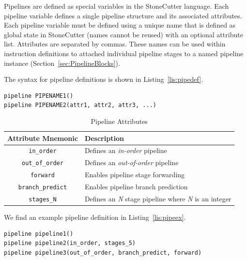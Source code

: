 \documentclass{article}
\begin{document}
Pipelines are defined as special variables in the StoneCutter language.  Each pipeline variable defines a single 
pipeline structure and its associated attributes.  Each pipeline variable must be defined using a unique name that 
is defined as global state in StoneCutter (names cannot be reused) with an optional attribute list.  Attributes are separated by commas.  These names 
can be used within instruction definitions to attached individual pipeline stages to a named pipeline instance (Section~\ref{sec:PipelineBlocks}).  

The syntax for pipeline definitions is shown in Listing~\ref{lis:pipedef}.  

\vspace{0.125in}
\begin{lstlisting}[frame=single,style=base,caption={Pipeline Definition Syntax},captionpos=b,label={lis:pipedef}]
pipeline PIPENAME1()
pipeline PIPENAME2(attr1, attr2, attr3, ...)
\end{lstlisting}

\begin{table}[h]
\begin{center}
\caption{Pipeline Attributes}
\vspace{0.125in}
\label{tab:pipeattrs}
\begin{tabular}{|c|l|}
\hline
\textbf{Attribute Mnemonic} & \textbf{Description}\\
\hline
\texttt{in\_order} & Defines an \textit{in-order} pipeline\\
\hline
\texttt{out\_of\_order} & Defines an \textit{out-of-order} pipeline\\
\hline
\texttt{forward} & Enables pipeline stage forwarding\\
\hline
\texttt{branch\_predict} & Enables pipeline branch prediction\\
\hline
\texttt{stages\_N} & Defines an \textit{N} stage pipeline where \textit{N} is an integer\\
\hline
\end{tabular}
\end{center}
\end{table}

We find an example pipeline definition in Listing~\ref{lis:pipeex}.  

\vspace{0.125in}
\begin{lstlisting}[frame=single,style=base,caption={Pipeline DefinitionExample},captionpos=b,label={lis:pipeex}]
pipeline pipeline1()
pipeline pipeline2(in_order, stages_5)
pipeline pipeline3(out_of_order, branch_predict, forward)
\end{lstlisting}
\end{document}
